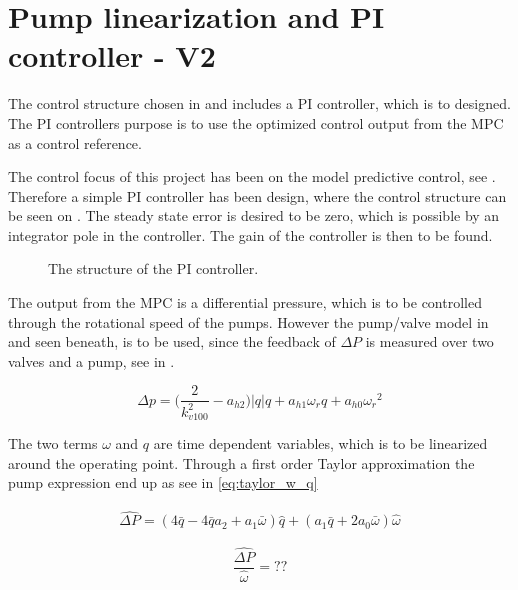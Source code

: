 \chapter{Pump linearization and PI controller - V2}
\label{cha:linear_pump2}

The control structure chosen in  and  includes a PI controller, which is to designed. The PI controllers purpose is to use the optimized control output from the MPC as a control reference. 

The control focus of this project has been on the model predictive control, see . Therefore a simple PI controller has been design, where the control structure can be seen on . The steady state error is desired to be zero, which is possible by an integrator pole in the controller. The gain of the controller is then to be found. 

\begin{figure}[H]
\centering
  
\caption{The structure of the PI controller.}
\label{fig:simple_PI}
\end{figure}

The output from the MPC is a differential pressure, which is to be controlled through the rotational speed of the pumps. However the pump/valve model in  and seen beneath, is to be used, since the feedback of $\Delta P$ is measured over two valves and a pump, see  in .

\begin{equation*}
 \Delta p = \Big(\frac{2}{k_{v100}^2} - a_{h2}\Big)|q| q  + a_{h1} \omega_r q + a_{h0}{\omega_r}^2
\end{equation*}

The two terms $\omega$ and $q$ are time dependent variables, which is to be linearized around the operating point. Through a first order Taylor approximation the pump expression end up as see in \eqref{eq:taylor_w_q}

\begin{equation}
	\begin{split}
	\hat{\Delta P} = (4\bar{q}-4\bar{q}a_2+a_1\bar{\omega})\hat{q} + (a_1\bar{q} + 2a_0\bar{\omega})\hat{\omega}
	\end{split}
	\label{eq:taylor_w_q}
\end{equation}


\begin{equation}
	\frac{\hat{\Delta P}}{\hat{\omega}} = ??
\end{equation}